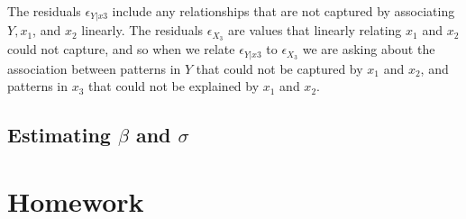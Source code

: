 The residuals $\epsilon_{Y|x3}$ include any relationships that are not captured by associating $Y, x_{1}$, and $x_{2}$ linearly. 
The residuals $\epsilon_{X_{3}}$ are values that linearly relating $x_{1}$ and $x_{2}$ could not capture, and so when we relate $\epsilon_{Y|x3}$ to $\epsilon_{X_{3}}$ we are asking about the association between patterns in $Y$ that could not be captured by $x_{1}$ and $x_{2}$, and patterns in $x_{3}$ that could not be explained by $x_{1}$ and $x_{2}$.

\subsection{Estimating $\beta$ and $\sigma$}


\section{Homework}
